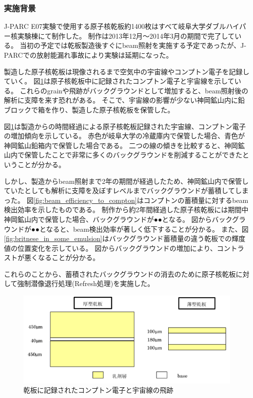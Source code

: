 \documentclass[12pt,a4paper]{jarticle}
\begin{document}
\subsubsection{実施背景}
J-PARC E07実験で使用する原子核乾板約1400枚はすべて岐阜大学ダブルハイパー核実験棟にて制作した。
制作は2013年12月～2014年3月の期間で完了している。
当初の予定では乾板製造後すぐにbeam照射を実施する予定であったが、J-PARCでの放射能漏れ事故により実験は延期になった。
\par
製造した原子核乾板は現像されるまで空気中の宇宙線やコンプトン電子を記録していく。
図\ref{fig:compton_and_cosmicray_in_emulsion}は原子核乾板中に記録されたコンプトン電子と宇宙線を示している。
これらのgrainや飛跡がバックグラウンドとして増加すると、beam照射後の解析に支障を来す恐れがある。
そこで、宇宙線の影響が少ない神岡鉱山内に鉛ブロックで箱を作り、製造した原子核乾板を保管した。
\par
図\ref{fig:compton_and_cosmicray_in_emulsion}は製造からの時間経過による原子核乾板記録された宇宙線、コンプトン電子の増加傾向を示している。
赤色が岐阜大学の冷蔵庫内で保管した場合、青色が神岡鉱山鉛箱内で保管した場合である。
二つの線の傾きを比較すると、神岡鉱山内で保管したことで非常に多くのバックグラウンドを削減することができたということが分かる。
\par
しかし、製造からbeam照射まで2年の期間が経過したため、神岡鉱山内で保管していたとしても解析に支障を及ぼすレベルまでバックグラウンドが蓄積してしまった。
図\ref{fig:beam_efficiency_to_compton}はコンプトンの蓄積量に対するbeam検出効率を示したものである。
制作から約2年間経過した原子核乾板には期間中神岡鉱山内で保管した場合、バックグラウンドが●●となる。
図からバックグラウンドが●●となると、beam検出効率が著しく低下することが分かる。
また、図\ref{fig:britnese_in_some_emulsion}はバックグラウンド蓄積量の違う乾板での輝度値の位置変化を示している。
図からバックグラウンドの増加により、コントラストが悪くなることが分かる。
\par
これらのことから、蓄積されたバックグラウンドの消去のために原子核乾板に対して強制潜像退行処理(Refresh処理)を実施した。
\par
\begin{figure}[htbp]
  \centering
     \includegraphics[width=140mm]{emulsionorder.png}
  \caption{乾板に記録されたコンプトン電子と宇宙線の飛跡\label{fig:compton_and_cosmicray_in_emulsion}}
\end{figure}
\end{document}
